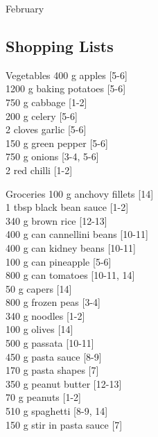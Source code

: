 \begin{menu}{February}
    \subsection*{Shopping Lists}
      \begin{shoppinglist}{Vegetables}
      400 g apples {\scriptsize[5-6]}\\
      1200 g baking potatoes {\scriptsize[5-6]}\\
      750 g cabbage {\scriptsize[1-2]}\\
      200 g celery {\scriptsize[5-6]}\\
      2 cloves garlic {\scriptsize[5-6]}\\
      150 g green pepper {\scriptsize[5-6]}\\
      750 g onions {\scriptsize[3-4, 5-6]}\\
      2  red chilli {\scriptsize[1-2]}\\
      \end{shoppinglist}%
      \begin{shoppinglist}{Groceries}
      100 g anchovy fillets {\scriptsize[14]}\\
      1 tbsp black bean sauce {\scriptsize[1-2]}\\
      340 g brown rice {\scriptsize[12-13]}\\
      400 g can cannellini beans {\scriptsize[10-11]}\\
      400 g can kidney beans {\scriptsize[10-11]}\\
      100 g can pineapple {\scriptsize[5-6]}\\
      800 g can tomatoes {\scriptsize[10-11, 14]}\\
      50 g capers {\scriptsize[14]}\\
      800 g frozen peas {\scriptsize[3-4]}\\
      340 g noodles {\scriptsize[1-2]}\\
      100 g olives {\scriptsize[14]}\\
      500 g passata {\scriptsize[10-11]}\\
      450 g pasta sauce {\scriptsize[8-9]}\\
      170 g pasta shapes {\scriptsize[7]}\\
      350 g peanut butter {\scriptsize[12-13]}\\
      70 g peanuts {\scriptsize[1-2]}\\
      510 g spaghetti {\scriptsize[8-9, 14]}\\
      150 g stir in pasta sauce {\scriptsize[7]}\\

\end{shoppinglist}
\end{menu}
